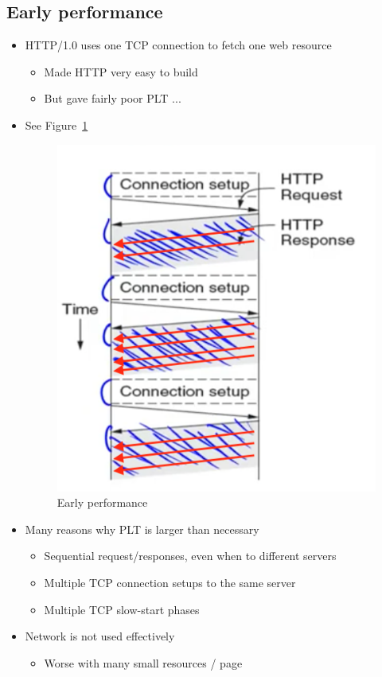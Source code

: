 \documentclass[12pt]{ctexart}   %
\begin{document}
	\subsection{Early performance}
	\begin{itemize}
		\item HTTP/1.0 uses one TCP connection to fetch one web resource
		\begin{itemize}
			\item Made HTTP very easy to build
			\item But gave fairly poor PLT ...
		\end{itemize}
		\item See Figure~\ref{fig:8-5-1}
		  
		 \begin{figure}[h!] %
		\centering
		 \includegraphics[scale=0.7]{images/8-5-1}
		\caption{ Early performance}
		 \label{fig:8-5-1}
		 \end{figure}
		
		\item Many reasons why PLT is larger than necessary
		\begin{itemize}
			\item Sequential request/responses, even when to different servers
			\item Multiple TCP connection setups to the same server
			\item Multiple TCP slow-start phases
		\end{itemize}
		
		\item Network is not used effectively
		\begin{itemize}
			\item Worse with many small resources / page
		\end{itemize}
	\end{itemize}
	
\end{document}

